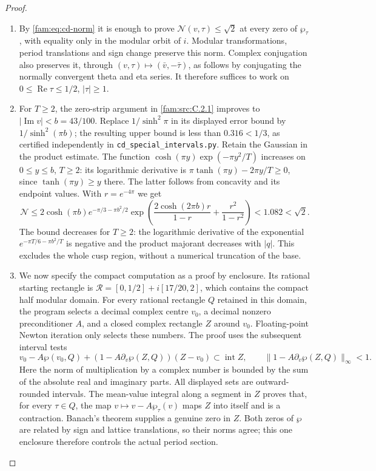 \begin{proof}
\begin{enumerate}[label=\arabic*.,leftmargin=*]
\item By \eqref{fam:eq:cd-norm} it is enough to prove
$\mathcal N(v,\tau)\leq\sqrt2$ at every zero of $\wp_\tau$, with equality
only in the modular orbit of $i$. Modular transformations, period
translations and sign change preserve this norm. Complex conjugation
also preserves it, through
$(v,\tau)\mapsto(\bar v,-\bar\tau)$, as follows by conjugating the
normally convergent theta and eta series. It therefore suffices to work
on $0\leq\operatorname{Re}\tau\leq1/2$, $|\tau|\geq1$.

\item For $T\geq2$, the zero-strip argument in \ref{fam:src:C.2.1} improves to
$|\operatorname{Im}v|<b=43/100$. Replace $1/\sinh^2\pi$ in its displayed
error bound by $1/\sinh^2(\pi b)$; the resulting upper bound is less
than $0.316<1/3$, as certified independently in
\texttt{cd\_special\_intervals.py}. Retain the Gaussian in the product
estimate. The function
$\cosh(\pi y)\exp(-\pi y^2/T)$ increases on $0\leq y\leq b$, $T\geq2$:
its logarithmic derivative is $\pi\tanh(\pi y)-2\pi y/T\geq0$, since
$\tanh(\pi y)\geq y$ there. The latter follows from concavity and its
endpoint values. With $r=e^{-4\pi}$ we get
\[
 \mathcal N\leq
 2\cosh(\pi b)e^{-\pi/3-\pi b^2/2}
 \exp\left(\frac{2\cosh(2\pi b)r}{1-r}+
                  \frac{r^2}{1-r^2}\right)
 <1.082<\sqrt2.
\]
The bound decreases for $T\geq2$: the logarithmic derivative of the
exponential $e^{-\pi T/6-\pi b^2/T}$ is negative and the product
majorant decreases with $|q|$. This excludes the whole cusp region,
without a numerical truncation of the base.

\item We now specify the compact computation as a proof by enclosure.
Its rational starting rectangle is
$\mathcal R=[0,1/2]+i[17/20,2]$, which contains the compact half modular
domain. For every rational rectangle $Q$ retained in this domain, the
program selects a decimal complex centre $v_0$, a decimal nonzero
preconditioner $A$, and a closed complex rectangle $Z$ around $v_0$.
Floating-point Newton iteration only selects these numbers. The proof
uses the subsequent interval tests
\[
 v_0-A\wp(v_0,Q)+(1-A\partial_v\wp(Z,Q))(Z-v_0)
       \subset\operatorname{int}Z,
 \qquad
 \|1-A\partial_v\wp(Z,Q)\|_\infty<1.
\]
Here the norm of multiplication by a complex number is bounded by the
sum of the absolute real and imaginary parts. All displayed sets are
outward-rounded intervals. The mean-value integral along a segment in
$Z$ proves that, for every $\tau\in Q$, the map
$v\mapsto v-A\wp_\tau(v)$ maps $Z$ into itself and is a contraction.
Banach's theorem supplies a genuine zero in $Z$. Both zeros of $\wp$
are related by sign and lattice translations, so their norms agree;
this one enclosure therefore controls the actual period section.


\end{enumerate}
\end{proof}
